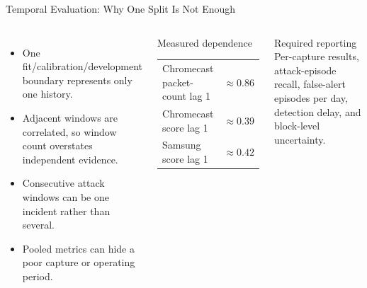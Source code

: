 \documentclass[aspectratio=169,10pt]{beamer}
\begin{document}
\begin{frame}{Temporal Evaluation: Why One Split Is Not Enough}
\begin{columns}[T,onlytextwidth]
\begin{itemize}
  \item One fit/calibration/development boundary represents only one history.
  \item Adjacent windows are correlated, so window count overstates independent
  evidence.
  \item Consecutive attack windows can be one incident rather than several.
  \item Pooled metrics can hide a poor capture or operating period.
\end{itemize}

\begin{block}{Measured dependence}
\small
\begin{tabular}{@{}lr@{}}
Chromecast packet-count lag 1 & $\approx 0.86$\\
Chromecast score lag 1 & $\approx 0.39$\\
Samsung score lag 1 & $\approx 0.42$\\
\end{tabular}
\end{block}

\begin{alertblock}{Required reporting}
Per-capture results, attack-episode recall, false-alert episodes per day,
detection delay, and block-level uncertainty.
\end{alertblock}
\end{columns}
\end{frame}
\end{document}
